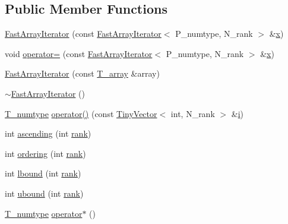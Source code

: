 \subsection*{Public Member Functions}
\begin{DoxyCompactItemize}
\item 
\hyperlink{classFastArrayIterator_a86e930eba54f976a48e14045aca9b7ac}{Fast\+Array\+Iterator} (const \hyperlink{classFastArrayIterator}{Fast\+Array\+Iterator}$<$ P\+\_\+numtype, N\+\_\+rank $>$ \&\hyperlink{vecnorm1_8cc_ac73eed9e41ec09d58f112f06c2d6cb63}{x})
\item 
void \hyperlink{classFastArrayIterator_a6abb8b43e823fee038d7617909958f40}{operator=} (const \hyperlink{classFastArrayIterator}{Fast\+Array\+Iterator}$<$ P\+\_\+numtype, N\+\_\+rank $>$ \&\hyperlink{vecnorm1_8cc_ac73eed9e41ec09d58f112f06c2d6cb63}{x})
\item 
\hyperlink{classFastArrayIterator_a7ad631b89bfeb4dc779312726ce428f0}{Fast\+Array\+Iterator} (const \hyperlink{classFastArrayIterator_a8cf906d33462b33342b5155db7087127}{T\+\_\+array} \&array)
\item 
\hyperlink{classFastArrayIterator_aaa30143631598a692acc0feb21d0ae72}{$\sim$\+Fast\+Array\+Iterator} ()
\item 
\hyperlink{classFastArrayIterator_a6b72f4ef8bfecc51f2f93b89b21d5033}{T\+\_\+numtype} \hyperlink{classFastArrayIterator_ab42e0003f2bc67a06251b477505da462}{operator()} (const \hyperlink{classTinyVector}{Tiny\+Vector}$<$ int, N\+\_\+rank $>$ \&\hyperlink{indexexpr_8h_aabd77643995707c185e95c8cb2782c81}{i})
\item 
int \hyperlink{classFastArrayIterator_a7fbf4ba82e49c8118c6cb8c034703be4}{ascending} (int \hyperlink{classFastArrayIterator_a51a4638ef5e68f65172cfbdb764e28ac}{rank})
\item 
int \hyperlink{classFastArrayIterator_af83b4a10c1750abe4a53f1da2c4f81f5}{ordering} (int \hyperlink{classFastArrayIterator_a51a4638ef5e68f65172cfbdb764e28ac}{rank})
\item 
int \hyperlink{classFastArrayIterator_a58b7212d08e536e8df9a15961377b498}{lbound} (int \hyperlink{classFastArrayIterator_a51a4638ef5e68f65172cfbdb764e28ac}{rank})
\item 
int \hyperlink{classFastArrayIterator_a3a62684e37aeb2b5809145fc2f1a3c95}{ubound} (int \hyperlink{classFastArrayIterator_a51a4638ef5e68f65172cfbdb764e28ac}{rank})
\item 
\hyperlink{classFastArrayIterator_a6b72f4ef8bfecc51f2f93b89b21d5033}{T\+\_\+numtype} \hyperlink{classFastArrayIterator_a02776e0b560a7c873ed5c223664f9acd}{operator$\ast$} ()

\end{DoxyCompactItemize}
